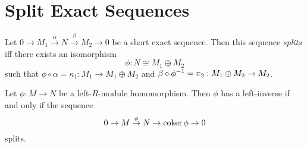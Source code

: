 \section{Split Exact Sequences}

\begin{df}
Let $0 \rightarrow M_1 \stackrel{\alpha}{\rightarrow} N \stackrel{\beta}{\rightarrow} M_2 \rightarrow 0$ be a short exact sequence. Then this sequence \emph{splits} iff there exists an isomorphism
\[ \phi : N \cong M_1 \oplus M_2 \]
such that $\phi \circ \alpha = \kappa_1 : M_1 \rightarrow M_1 \oplus M_2$ and $\beta \circ {\phi}^{-1} = \pi_2 : M_1 \oplus M_2 \rightarrow M_2$.
\end{df}

\begin{prop}
Let $\phi : M \rightarrow N$ be a left-$R$-module homomorphism. Then $\phi$ has a left-inverse if and only if the sequence
\[ 0 \rightarrow M \stackrel{\phi}{\rightarrow} N \rightarrow \operatorname{coker} \phi \rightarrow 0 \]
splits.
\end{prop}

